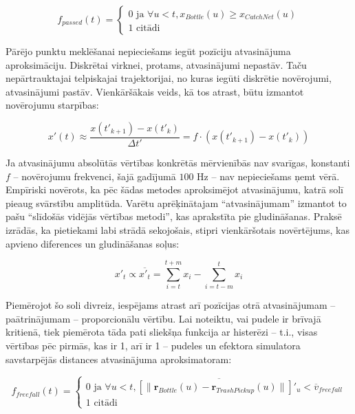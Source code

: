 \documentclass[12pt, a4paper]{article}
\numberwithin{equation}{section} %
\begin{document}
\begin{equation}
    f_{passed} (t) = \begin{cases}
        0 \text{ ja } \forall u < t, x_{Bottle}(u) \geq x_{CatchNet}(u) \\
        1 \text{ citādi }
    \end{cases}
\end{equation}

Pārējo punktu meklēšanai nepieciešams iegūt pozīciju atvasinājuma aproksimāciju. Diskrētai virknei, protams, atvasinājumi nepastāv. Taču nepārtrauktajai telpiskajai trajektorijai, no kuras iegūti diskrētie novērojumi, atvasinājumi pastāv. Vienkāršākais veids, kā tos atrast, būtu izmantot novērojumu starpības:

\begin{equation}
    x'(t) \approx \frac{x(t'_{k+1}) - x(t'_{k})}{\Delta t'} = f \cdot \left (x(t'_{k+1}) - x(t'_{k}) \right )
\end{equation}

Ja atvasinājumu absolūtās vērtības konkrētās mērvienībās nav svarīgas, konstanti $f$ -- novērojumu frekvenci, šajā gadījumā $100$ Hz -- nav nepieciešams ņemt vērā. Empīriski novērots, ka pēc šādas metodes aproksimējot atvasinājumu, katrā solī pieaug svārstību amplitūda. Varētu aprēķinātajam ``atvasinājumam'' izmantot to pašu ``slīdošās vidējās vērtības metodi'', kas aprakstīta pie gludināšanas. Praksē izrādās, ka pietiekami labi strādā sekojošais, stipri vienkāršotais novērtējums, kas apvieno diferences un gludināšanas soļus:

\begin{equation}
    x'_t \propto \overline{x'_t} = \sum_{i=t}^{t+m}  x_i - \sum_{i=t-m}^{t}  x_i
\end{equation}

Piemērojot šo soli divreiz, iespējams atrast arī pozīcijas otrā atvasinājumam -- paātrinājumam -- proporcionālu vērtību. Lai noteiktu, vai pudele ir brīvajā kritienā, tiek piemērota tāda pati sliekšņa funkcija ar histerēzi -- t.i., visas vērtības pēc pirmās, kas ir 1, arī ir 1 -- pudeles un efektora simulatora savstarpējās distances atvasinājuma aproksimatoram:


\begin{equation}
    f_{freefall} (t) = \begin{cases}
        0 \text{ ja } \forall u < t,  \overline{ \left [ \lVert  \boldsymbol{r}_{Bottle}(u) -  \boldsymbol{r}_{TrashPickup}(u)  \rVert \right ] '_u} < \overline{v}_{freefall} \\
        1 \text{ citādi }
    \end{cases}
\end{equation}
\end{document}
